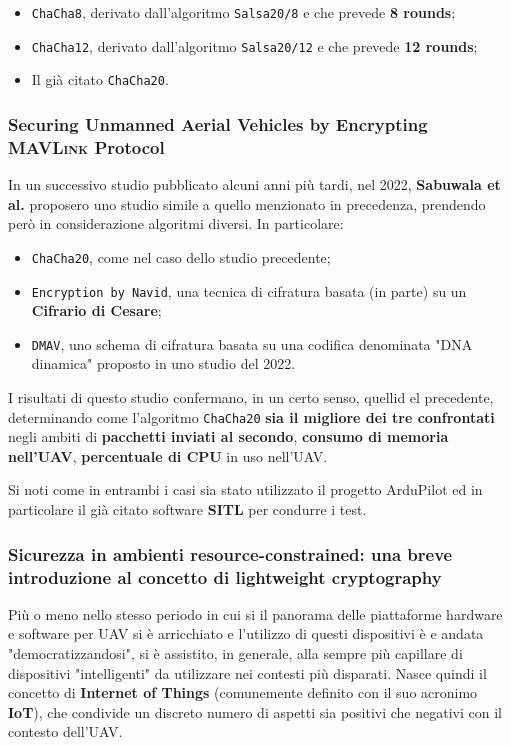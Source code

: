 \documentclass[a4paper, 12pt, oneside]{article}
\theoremstyle{definition}
\begin{document}
\begin{itemize}
    \item \texttt{ChaCha8}, derivato dall'algoritmo \texttt{Salsa20/8} e che prevede \textbf{8 rounds};
    \item \texttt{ChaCha12}, derivato dall'algoritmo \texttt{Salsa20/12} e che prevede \textbf{12 rounds};
    \item Il già citato \texttt{ChaCha20}.
\end{itemize}

\subsubsection{Securing Unmanned Aerial Vehicles by Encrypting \textsc{MAVLink} Protocol}

In un successivo studio \cite{10037546} pubblicato alcuni anni più tardi, nel 2022, \textbf{Sabuwala et al.} proposero uno studio simile a quello menzionato in precedenza, prendendo però in considerazione algoritmi diversi. In particolare:

\begin{itemize}
    \item \texttt{ChaCha20}, come nel caso dello studio precedente;
    \item \texttt{Encryption by Navid}, una tecnica di cifratura basata (in parte) su un \textbf{Cifrario di Cesare};
    \item \texttt{DMAV}, uno schema di cifratura basata su una codifica denominata "DNA dinamica" proposto in uno studio del 2022. 
\end{itemize}

I risultati di questo studio confermano, in un certo senso, quellid el precedente, determinando come l'algoritmo \texttt{ChaCha20} \textbf{sia il migliore dei tre confrontati} negli ambiti di \textbf{pacchetti inviati al secondo}, \textbf{consumo di memoria nell'UAV}, \textbf{percentuale di CPU} in uso nell'UAV.

Si noti come in entrambi i casi sia stato utilizzato il progetto ArduPilot ed in particolare il già citato software \textbf{SITL} per condurre i test.

\subsubsection{Sicurezza in ambienti resource-constrained: una breve introduzione al concetto di lightweight cryptography}
Più o meno nello stesso periodo in cui si il panorama delle piattaforme hardware e software per UAV si è arricchiato e l'utilizzo di questi dispositivi è e andata "democratizzandosi", si è assistito, in generale, alla sempre più capillare di dispositivi "intelligenti" da utilizzare nei contesti più disparati. Nasce quindi il concetto di \textbf{Internet of Things} (comunemente definito con il suo acronimo \textbf{IoT}), che condivide un discreto numero di aspetti sia positivi che negativi con il contesto dell'UAV. 
\end{document}
